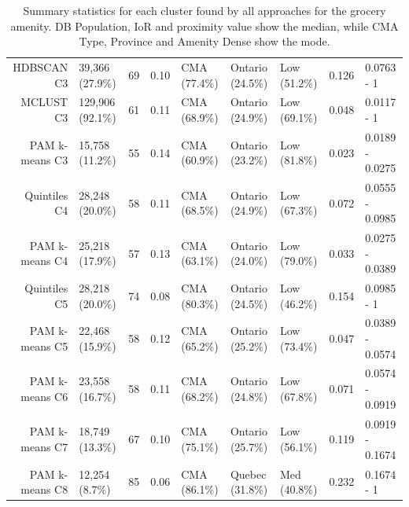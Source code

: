 \documentclass[11pt, a4paper]{article}
\begin{document}
\begin{table}[H]
{\begin{tabular}{|r|llllllll|}
  HDBSCAN C3 & 39,366 (27.9\%) & 69 & 0.10 & CMA (77.4\%) & Ontario (24.5\%) & Low (51.2\%) & 0.126 & 0.0763 - 1 \\ 
  MCLUST C3 & 129,906 (92.1\%) & 61 & 0.11 & CMA (68.9\%) & Ontario (24.9\%) & Low (69.1\%) & 0.048 & 0.0117 - 1 \\ 
  PAM k-means C3 & 15,758 (11.2\%) & 55 & 0.14 & CMA (60.9\%) & Ontario (23.2\%) & Low (81.8\%) & 0.023 & 0.0189 - 0.0275 \\ 
  Quintiles C4 & 28,248 (20.0\%) & 58 & 0.11 & CMA (68.5\%) & Ontario (24.9\%) & Low (67.3\%) & 0.072 & 0.0555 - 0.0985 \\ 
  PAM k-means C4 & 25,218 (17.9\%) & 57 & 0.13 & CMA (63.1\%) & Ontario (24.0\%) & Low (79.0\%) & 0.033 & 0.0275 - 0.0389 \\ 
  Quintiles C5 & 28,218 (20.0\%) & 74 & 0.08 & CMA (80.3\%) & Ontario (24.5\%) & Low (46.2\%) & 0.154 & 0.0985 - 1 \\ 
  PAM k-means C5 & 22,468 (15.9\%) & 58 & 0.12 & CMA (65.2\%) & Ontario (25.2\%) & Low (73.4\%) & 0.047 & 0.0389 - 0.0574 \\ 
  PAM k-means C6 & 23,558 (16.7\%) & 58 & 0.11 & CMA (68.2\%) & Ontario (24.8\%) & Low (67.8\%) & 0.071 & 0.0574 - 0.0919 \\ 
  PAM k-means C7 & 18,749 (13.3\%) & 67 & 0.10 & CMA (75.1\%) & Ontario (25.7\%) & Low (56.1\%) & 0.119 & 0.0919 - 0.1674 \\ 
  PAM k-means C8 & 12,254 (8.7\%) & 85 & 0.06 & CMA (86.1\%) & Quebec (31.8\%) & Med (40.8\%) & 0.232 & 0.1674 - 1 \\ 
   \hline
\end{tabular}
}
\caption[Grocery cluster profiles]{Summary statistics for each cluster found by all approaches for the grocery amenity. DB Population, IoR and proximity value show the median, while CMA Type, Province and Amenity Dense show the mode.}\label{groceryprofiles}
\end{table}
\end{document}
